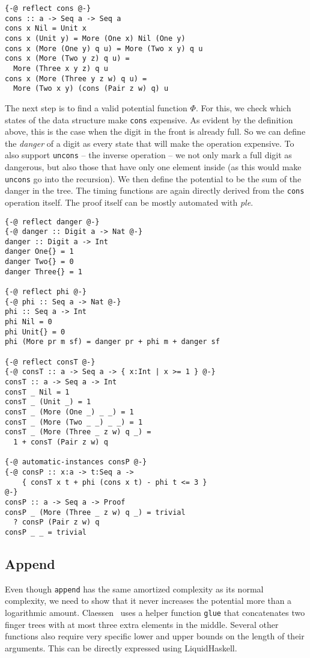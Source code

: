 \documentclass[sigplan,screen]{acmart}
\begin{document}
\begin{lstlisting}
{-@ reflect cons @-}
cons :: a -> Seq a -> Seq a
cons x Nil = Unit x
cons x (Unit y) = More (One x) Nil (One y)
cons x (More (One y) q u) = More (Two x y) q u
cons x (More (Two y z) q u) =
  More (Three x y z) q u
cons x (More (Three y z w) q u) =
  More (Two x y) (cons (Pair z w) q) u
\end{lstlisting}

The next step is to find a valid potential function $\Phi$. For this, we check which states of the data structure make \texttt{cons} expensive. As evident by the definition above, this is the case when the digit in the front is already full. So we can define the \textit{danger} of a digit as every state that will make the operation expensive. To also support \texttt{uncons} -- the inverse operation -- we not only mark a full digit as dangerous, but also those that have only one element inside (as this would make \texttt{uncons} go into the recursion). We then define the potential to be the sum of the danger in the tree. The timing functions are again directly derived from the \texttt{cons} operation itself. The proof itself can be mostly automated with \textit{ple}.

\begin{lstlisting}
{-@ reflect danger @-}
{-@ danger :: Digit a -> Nat @-}
danger :: Digit a -> Int
danger One{} = 1
danger Two{} = 0
danger Three{} = 1

{-@ reflect phi @-}
{-@ phi :: Seq a -> Nat @-}
phi :: Seq a -> Int
phi Nil = 0
phi Unit{} = 0
phi (More pr m sf) = danger pr + phi m + danger sf

{-@ reflect consT @-}
{-@ consT :: a -> Seq a -> { x:Int | x >= 1 } @-}
consT :: a -> Seq a -> Int
consT _ Nil = 1
consT _ (Unit _) = 1
consT _ (More (One _) _ _) = 1
consT _ (More (Two _ _) _ _) = 1
consT _ (More (Three _ z w) q _) =
  1 + consT (Pair z w) q

{-@ automatic-instances consP @-}
{-@ consP :: x:a -> t:Seq a ->
    { consT x t + phi (cons x t) - phi t <= 3 }
@-}
consP :: a -> Seq a -> Proof
consP _ (More (Three _ z w) q _) = trivial
  ? consP (Pair z w) q
consP _ _ = trivial
\end{lstlisting}

\subsection{Append}\label{sec:append}

Even though \texttt{append} has the same amortized complexity as its normal complexity, we need to show that it never increases the potential more than a logarithmic amount. Claessen~\cite{fingertrees_new} uses a helper function \texttt{glue} that concatenates two finger trees with at most three extra elements in the middle. Several other functions also require very specific lower and upper bounds on the length of their arguments. This can be directly expressed using LiquidHaskell.
\end{document}

